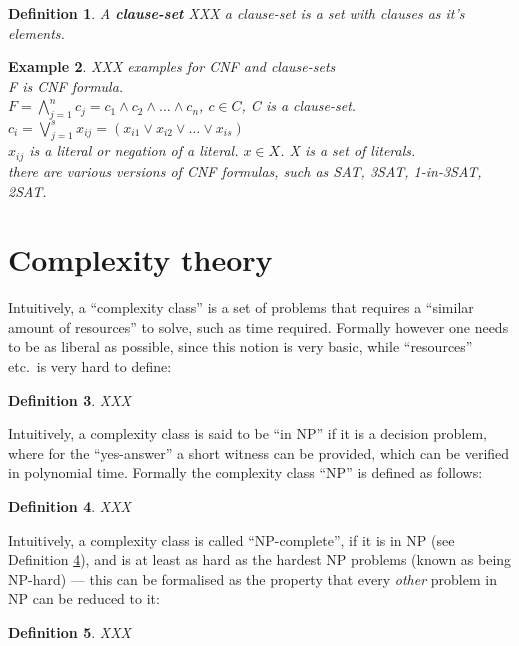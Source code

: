 \documentclass[a4paper]{report}
\newtheorem{defi}{Definition}[section]
\newtheorem{examp}[defi]{Example}
\begin{document}
\begin{defi}\label{def:CLS}
  A \textbf{clause-set}  XXX a clause-set is a set with clauses as it's elements.
\end{defi}

\begin{examp}\label{exp:CLS}
  XXX examples for CNF and clause-sets\\
F is CNF formula.\\ 
$F = \bigwedge_{j=1}^{n} c_j = c_1 \wedge c_2 \wedge \dots \wedge c_n$,
$c \in C$,  C is a clause-set.\\
$c_i = \bigvee_{j=1}^{s} x_{ij} =  (x_{i1} \vee x_{i2} \vee \dots \vee x_{is})$\\
$x_{ij}$ is a literal or negation of a literal.
$x \in X$. X is a set of literals.\\

there are various versions of CNF formulas, such as SAT, 3SAT, 1-in-3SAT, 2SAT.
\end{examp}


\section{Complexity theory}
\label{sec:basicscomplexitytheory}

Intuitively, a ``complexity class'' is a set of problems that requires a ``similar amount of resources'' to solve, such as time required. Formally however one needs to be as liberal as possible, since this notion is very basic, while ``resources'' etc.\ is very hard to define:
\begin{defi}\label{def:complexityclass}
  XXX
\end{defi}

Intuitively, a complexity class is said to be ``in NP'' if it is a decision problem, where for the ``yes-answer'' a short witness can be provided, which can be verified in polynomial time. Formally the complexity class ``NP'' is defined as follows:
\begin{defi}\label{def:inNP}
  XXX
\end{defi}

Intuitively, a complexity class is called ``NP-complete'', if it is in NP (see Definition \ref{def:inNP}), and is at least as hard as the hardest NP problems (known as being NP-hard) --- this can be formalised as the property that every \emph{other} problem in NP can be reduced to it:
\begin{defi}\label{def:NPcomplete}
  XXX
\end{defi}
\end{document}
